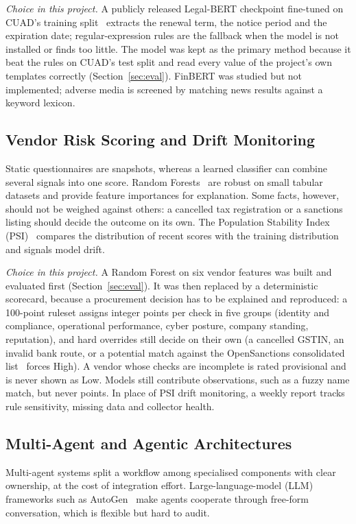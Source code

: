 \emph{Choice in this project.} A publicly released Legal-BERT checkpoint fine-tuned on CUAD's training split~\cite{apostolo2023legalbertcuad} extracts the renewal term, the notice period and the expiration date; regular-expression rules are the fallback when the model is not installed or finds too little. The model was kept as the primary method because it beat the rules on CUAD's test split and read every value of the project's own templates correctly (Section~\ref{sec:eval}). FinBERT was studied but not implemented; adverse media is screened by matching news results against a keyword lexicon.

\subsection{Vendor Risk Scoring and Drift Monitoring}
Static questionnaires are snapshots, whereas a learned classifier can combine several signals into one score. Random Forests~\cite{breiman2001random} are robust on small tabular datasets and provide feature importances for explanation. Some facts, however, should not be weighed against others: a cancelled tax registration or a sanctions listing should decide the outcome on its own. The Population Stability Index (PSI)~\cite{yurdakul2018psi} compares the distribution of recent scores with the training distribution and signals model drift.

\emph{Choice in this project.} A Random Forest on six vendor features was built and evaluated first (Section~\ref{sec:eval}). It was then replaced by a deterministic scorecard, because a procurement decision has to be explained and reproduced: a 100-point ruleset assigns integer points per check in five groups (identity and compliance, operational performance, cyber posture, company standing, reputation), and hard overrides still decide on their own (a cancelled GSTIN, an invalid bank route, or a potential match against the OpenSanctions consolidated list~\cite{opensanctions} forces High). A vendor whose checks are incomplete is rated provisional and is never shown as Low. Models still contribute observations, such as a fuzzy name match, but never points. In place of PSI drift monitoring, a weekly report tracks rule sensitivity, missing data and collector health.

\subsection{Multi-Agent and Agentic Architectures}
\label{sec:agentdef}
Multi-agent systems split a workflow among specialised components with clear ownership, at the cost of integration effort. Large-language-model (LLM) frameworks such as AutoGen~\cite{wu2023autogen} make agents cooperate through free-form conversation, which is flexible but hard to audit.

